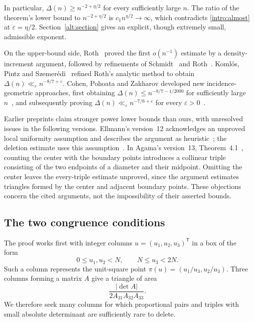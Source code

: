 In particular, $\Delta(n)\ge n^{-2+\eta/2}$ for every sufficiently large
$n$. The ratio of the theorem's lower bound to $n^{-2+\eta/2}$ is
$c_1n^{\eta/2}\to\infty$, which contradicts \eqref{intro:almost} at
$\varepsilon=\eta/2$. Section~\ref{alt:section} gives an explicit, though
extremely small, admissible exponent.

On the upper-bound side, Roth~\cite{Roth1951} proved the first
$o(n^{-1})$ estimate by a density-increment argument, followed by refinements
of Schmidt~\cite{Schmidt1972} and Roth~\cite{Roth1972a,Roth1972b}.
Koml\'os, Pintz and Szemer\'edi~\cite{KPS1981} refined Roth's analytic method
to obtain $\Delta(n)\ll_\varepsilon n^{-8/7+\varepsilon}$.
Cohen, Pohoata and Zakharov developed new incidence-geometric approaches,
first obtaining $\Delta(n)\le n^{-8/7-1/2000}$ for sufficiently large
$n$~\cite[Theorem~1.1]{CPZ2023}, and subsequently proving
$\Delta(n)\ll_\varepsilon n^{-7/6+\varepsilon}$ for every
$\varepsilon>0$~\cite[Theorem~1.8]{CPZ2025}.

Earlier preprints claim stronger power lower bounds than ours, with
unresolved issues in the following versions. Ellmann's version~12
acknowledges an unproved local uniformity assumption and describes the
argument as heuristic~\cite[p.~3]{Ellmann2025}; the deletion estimate uses
this assumption~\cite[Theorem~4, pp.~5--6]{Ellmann2025}.
In Agama's version~13, Theorem~4.1~\cite[pp.~12--13]{Agama2026},
counting the center with the boundary points introduces a collinear triple
consisting of the two endpoints of a diameter and their midpoint.
Omitting the center leaves the every-triple estimate unproved, since the
argument estimates triangles formed by the center and adjacent boundary
points. These objections concern the cited arguments, not the impossibility
of their asserted bounds.

\subsection{The two congruence conditions}

The proof works first with integer columns $u=(u_1,u_2,u_3)^{\mathsf T}$
in a box of the form
\[
 0\le u_1,u_2<N,\qquad N\le u_3<2N.
\]
Such a column represents the unit-square point
$\pi(u)=(u_1/u_3,u_2/u_3)$. Three columns forming a matrix $A$ give a
triangle of area
\begin{equation}\label{intro:area}
 \frac{|\det A|}{2A_{31}A_{32}A_{33}}.
\end{equation}
We therefore seek many columns for which proportional pairs and triples
with small absolute determinant are sufficiently rare to delete.

